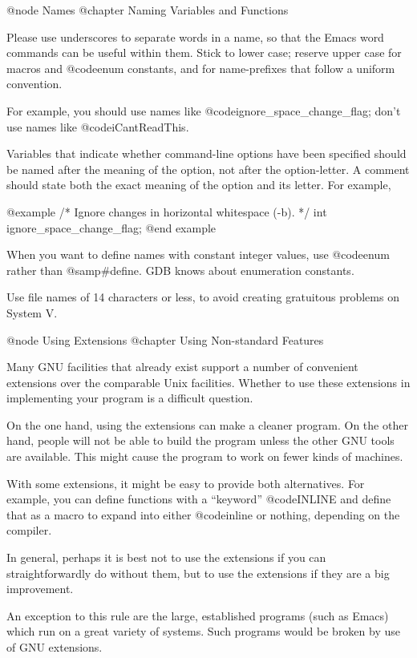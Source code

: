@node  Names
@chapter Naming Variables and Functions

Please use underscores to separate words in a name, so that the Emacs
word commands can be useful within them.  Stick to lower case; reserve
upper case for macros and @code{enum} constants, and for name-prefixes
that follow a uniform convention.

For example, you should use names like @code{ignore_space_change_flag};
don't use names like @code{iCantReadThis}.

Variables that indicate whether command-line options have been
specified should be named after the meaning of the option, not after
the option-letter.  A comment should state both the exact meaning of
the option and its letter.  For example,

@example
/* Ignore changes in horizontal whitespace (-b).  */
int ignore_space_change_flag;
@end example

When you want to define names with constant integer values, use
@code{enum} rather than @samp{#define}.  GDB knows about enumeration
constants.

Use file names of 14 characters or less, to avoid creating gratuitous
problems on System V.


@node Using Extensions
@chapter Using Non-standard Features

Many GNU facilities that already exist support a number of convenient
extensions over the comparable Unix facilities.  Whether to use these
extensions in implementing your program is a difficult question.

On the one hand, using the extensions can make a cleaner program.
On the other hand, people will not be able to build the program
unless the other GNU tools are available.  This might cause the
program to work on fewer kinds of machines.

With some extensions, it might be easy to provide both alternatives.
For example, you can define functions with a ``keyword'' @code{INLINE}
and define that as a macro to expand into either @code{inline} or
nothing, depending on the compiler.

In general, perhaps it is best not to use the extensions if you can
straightforwardly do without them, but to use the extensions if they
are a big improvement.

An exception to this rule are the large, established programs (such as
Emacs) which run on a great variety of systems.  Such programs would
be broken by use of GNU extensions.

